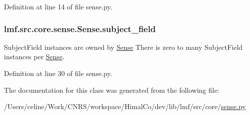 Definition at line 14 of file sense.\+py.

\hypertarget{classlmf_1_1src_1_1core_1_1sense_1_1_sense_a1a7524732c66093f7156792292d3c9c3}{
\subsubsection[{subject\+\_\+field}]{\setlength{\rightskip}{0pt plus 5cm}lmf.\+src.\+core.\+sense.\+Sense.\+subject\+\_\+field}}\label{classlmf_1_1src_1_1core_1_1sense_1_1_sense_a1a7524732c66093f7156792292d3c9c3}


Subject\+Field instances are owned by \hyperlink{classlmf_1_1src_1_1core_1_1sense_1_1_sense}{Sense} There is zero to many Subject\+Field instances per \hyperlink{classlmf_1_1src_1_1core_1_1sense_1_1_sense}{Sense}. 



Definition at line 30 of file sense.\+py.



The documentation for this class was generated from the following file\+:\begin{DoxyCompactItemize}
\item 
/\+Users/celine/\+Work/\+C\+N\+R\+S/workspace/\+Himal\+Co/dev/lib/lmf/src/core/\hyperlink{sense_8py}{sense.\+py}\end{DoxyCompactItemize}
